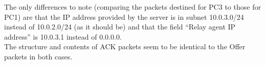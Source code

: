 The only differences to note (comparing the packets destined for PC3 to those for PC1) are that the IP address provided by the server is in subnet 10.0.3.0/24 instead of 10.0.2.0/24 (as it should be) and that the field ``Relay agent IP address'' is 10.0.3.1 instead of 0.0.0.0. \\
The structure and contents of ACK packets seem to be identical to the Offer packets in both cases.
